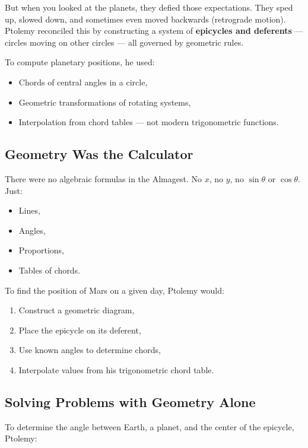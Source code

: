 But when you looked at the planets, they defied those expectations. They sped up, slowed down, and sometimes even moved backwards (retrograde motion). Ptolemy reconciled this by constructing a system of \textbf{epicycles and deferents} — circles moving on other circles — all governed by geometric rules.

To compute planetary positions, he used:

\begin{itemize}
    \item Chords of central angles in a circle,
    \item Geometric transformations of rotating systems,
    \item Interpolation from chord tables — not modern trigonometric functions.
\end{itemize}

\subsection{Geometry Was the Calculator}

There were no algebraic formulas in the Almagest. No \( x \), no \( y \), no \( \sin \theta \) or \( \cos \theta \). Just:

\begin{itemize}
    \item Lines,
    \item Angles,
    \item Proportions,
    \item Tables of chords.
\end{itemize}

To find the position of Mars on a given day, Ptolemy would:

\begin{enumerate}
    \item Construct a geometric diagram,
    \item Place the epicycle on its deferent,
    \item Use known angles to determine chords,
    \item Interpolate values from his trigonometric chord table.
\end{enumerate}

\subsection{Solving Problems with Geometry Alone}

To determine the angle between Earth, a planet, and the center of the epicycle, Ptolemy:


